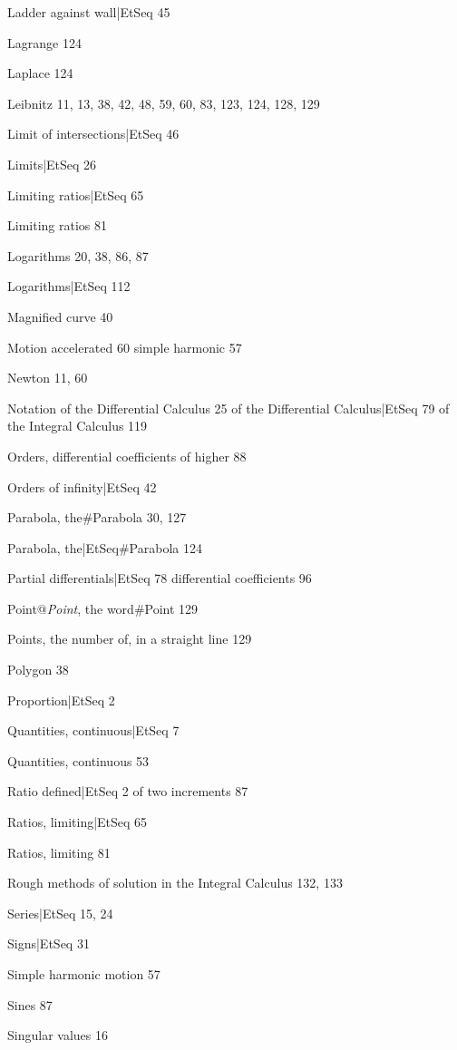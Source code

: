 \documentclass[12pt]{book}[2005/09/16]
\renewcommand{\(}{{\upshape(}}
\renewcommand{\)}{{\upshape)}}
\begin{document}
Ladder against wall|EtSeq 45 %

Lagrange 124

Laplace 124

Leibnitz 11, 13, 38, 42, 48, 59, 60, 83, 123, 124, 128, 129

Limit of intersections|EtSeq 46 %

Limits|EtSeq 26 %

Limiting ratios|EtSeq 65 %

Limiting ratios 81

Logarithms 20, 38, 86, 87

Logarithms|EtSeq 112 %

Magnified curve 40

Motion
  accelerated 60
  simple harmonic 57

Newton 11, 60

Notation
  of the Differential Calculus 25
  of the Differential Calculus|EtSeq 79 %
  of the Integral Calculus 119

Orders, differential coefficients of higher 88

Orders of infinity|EtSeq 42 %

Parabola, the#Parabola 30, 127

Parabola, the|EtSeq#Parabola 124 %

Partial
  differentials|EtSeq 78 %
  differential coefficients 96

Point@\emph{Point}, the word#Point 129

Points, the number of, in a straight line 129

Polygon 38

Proportion|EtSeq 2 %

Quantities, continuous|EtSeq 7 %

Quantities, continuous 53

Ratio
  defined|EtSeq 2 %
  of two increments 87

Ratios, limiting|EtSeq 65 %

Ratios, limiting 81

Rough methods of solution in the Integral Calculus 132, 133

Series|EtSeq 15, 24 %

Signs|EtSeq 31 %

Simple harmonic motion 57

Sines 87

Singular values 16
\end{document}
